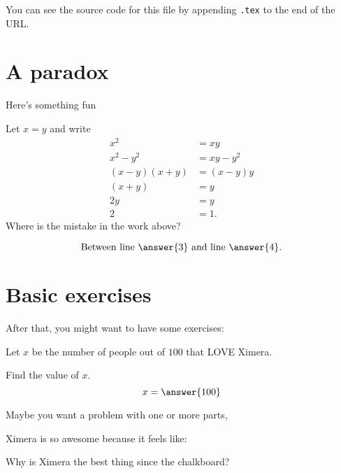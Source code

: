 \documentclass{ximera}
\begin{document}
You can see the source code for this file by appending \verb|.tex| to the end of the URL. 

\section{A paradox}


Here's something fun

\begin{paradox}[$0=1$] Let $x=y$ and write
\begin{align}
        x^2    & = xy       \\
    x^2 - y^2  & = xy - y^2 \\
    (x-y)(x+y) & = (x-y)y   \\
       (x+y)   & = y        \\
         2y    & = y        \\
          2    & =1.
\end{align}
Where is the mistake in the work above?
\begin{prompt} %
\[
\text{Between line }\answer{3} \text{ and line }\answer{4}.
\]
\end{prompt}
\end{paradox}


\section{Basic exercises}

After that, you might want to have some exercises:

\begin{exercise}
    Let $x$ be the number of people
    out of $100$ that LOVE Ximera.

    Find the value of $x$.
    \[
        x = \answer{100}
    \]
\end{exercise}

Maybe you want a problem with one or more parts,

\begin{exercise}
    Ximera is so awesome because it feels like:
    \begin{multipleChoice}
    \end{multipleChoice}
    \begin{exercise}
        Why is Ximera the best thing since the chalkboard?
        \begin{selectAll}
        \end{selectAll}
    \end{exercise}
\end{exercise}
\end{document}
